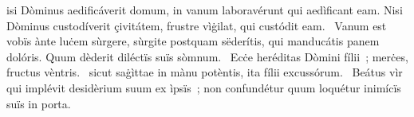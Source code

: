 \psalmChapterWithInscription{}
{ }
{%
isi Dòminus aedificáverit domum, in vanum laboravérunt qui aedìficant eam. Nisi Dòminus custodíverit çivitátem, frustre vìġilat, qui custódit eam. 
~Vanum est vobïs ànte luċem sùrgere, sùrgite postquam sëderítis, qui manducátis panem dolóris. Quum dèderit diléctïs suïs sòmnum. 
~Ecċe heréditas Dòmini fílii~; merċes, fructus vèntris. 
~sicut saġìttae in mànu potèntis, ita fílii excussórum. 
~Beátus vìr qui implévit desidèrium suum ex ìpsïs~; non confundétur quum loquétur inimícïs suïs in porta. 
}
